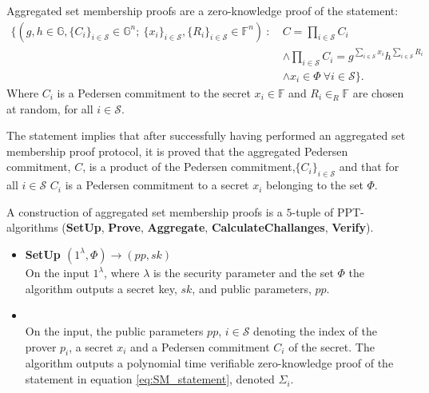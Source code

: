 \vspace{10pt}
\begin{Mydef}
\label{def:GeneralAggregation}
Aggregated set membership proofs are a zero-knowledge proof of the statement:
\begin{equation}
\begin{aligned} 
\label{eq:SMagg_statement}
    \big\{(g,h\in\mathds{G},\{C_i\}_{i\in\mathcal{S}}\in\mathds{G}^n;\:\{x_i\}_{i\in\mathcal{S}},\{R_i\}_{i\in\mathcal{S}}\in\mathds{F}^n)\:: 
\: &C=\prod_{i\in\mathcal{S}}C_i 
\\
 &\wedge \prod_{i\in\mathcal{S}}C_i  =   g^{\sum_{i\in\mathcal{S}}x_i} h^{\sum_{i\in\mathcal{S}}R_i} 
 \\
 &\wedge x_i \in \Phi \: \forall i\in\mathcal{S} \big\}.
\end{aligned}
\end{equation}
Where $C_i$ is a Pedersen commitment to the secret $x_i\in\mathds{F}$ and $R_i \in_R\mathds{F}$ are chosen at random, for all $i\in\mathcal{S}$.  

The statement implies that after successfully having performed an aggregated set membership proof protocol, it is proved that the aggregated Pedersen commitment, $C$, is a product of the Pedersen commitment,$\{C_i\}_{i\in\mathcal{S}}$ and that for all $i\in\mathcal{S}$ $C_i$ is a Pedersen commitment to a secret $x_i$ belonging to the set $\Phi$.

A construction of aggregated set membership proofs is a $5$-tuple of PPT-algorithms (\textbf{SetUp}, \textbf{Prove}, \textbf{Aggregate}, \textbf{CalculateChallanges}, \textbf{Verify}).
\\
\begin{itemize}
  \item\textbf{SetUp $(1^\lambda, \Phi)\xrightarrow[]{}(pp,sk)$}\\
On the input $1^\lambda$, where $\lambda$ is the security parameter and the set $\Phi$ the algorithm outputs a secret key, $sk$, and public parameters, $pp$. 

\item{}\\
On the input, the public parameters $pp$, $i\in\mathcal{S}$ denoting the index of the prover $p_i$, a secret $x_i$ and a Pedersen commitment $C_i$ of the secret.  The algorithm outputs a polynomial time verifiable zero-knowledge proof of the statement in equation \eqref{eq:SM_statement}, denoted $\Sigma_i$.


\end{itemize}
\end{Mydef}
